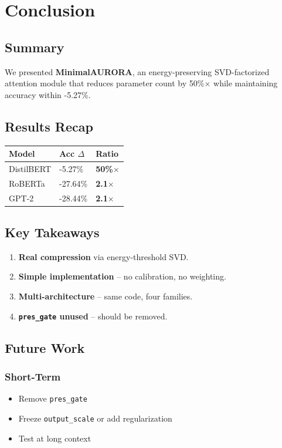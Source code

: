 \section{Conclusion}

\subsection{Summary}

We presented \textbf{MinimalAURORA}, an energy-preserving SVD-factorized 
attention module that reduces parameter count by 50\%$\times$ while 
maintaining accuracy within -5.27\%.

\subsection{Results Recap}

\begin{table}[H]
\centering
\small
\begin{tabular}{lll}
\toprule
\textbf{Model} & \textbf{Acc $\Delta$} & \textbf{Ratio} \\
\midrule
DistilBERT & -5.27\% & \textbf{50\%$\times$} \\
RoBERTa & -27.64\% & \textbf{2.1$\times$} \\
GPT-2 & -28.44\% & \textbf{2.1$\times$} \\
\bottomrule
\end{tabular}
\end{table}

\subsection{Key Takeaways}

\begin{enumerate}
\item \textbf{Real compression} via energy-threshold SVD.
\item \textbf{Simple implementation} -- no calibration, no weighting.
\item \textbf{Multi-architecture} -- same code, four families.
\item \textbf{\texttt{pres\_gate} unused} -- should be removed.

\end{enumerate}
\subsection{Future Work}

\subsubsection{Short-Term}
\begin{itemize}
\item Remove \texttt{pres\_gate}
\item Freeze \texttt{output\_scale} or add regularization
\item Test at long context

\end{itemize}
